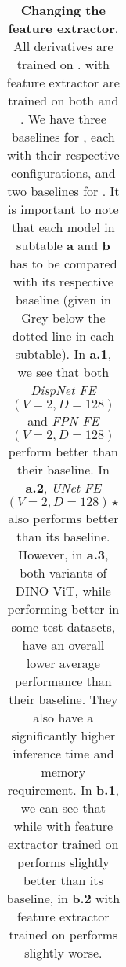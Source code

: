 \begin{table}[ht!]
\begin{adjustbox}{width=1\textwidth}
\begin{tabular}{|l
|c c
|c c
|c c
|c c
|c c
||c |c |c |c |c
|}
\hline
\end{tabular}
\end{adjustbox}
\caption[Changing the feature extractor]{\textbf{Changing the feature extractor}.
All {\mvsn} derivatives are trained on {\bms}. {\rmvd} with {\mvsn} feature extractor are trained on both {\brs} and {\bms}. We have three baselines for {\mvsn}, each with their respective configurations, and two baselines for {\rmvd}. It is important to note that each model in subtable \textbf{a} and \textbf{b} has to be compared with its respective baseline (given in Grey below the dotted line in each subtable). In \textbf{a.1}, we see that both \textit{DispNet FE $(V = 2, D = 128)$} and \textit{FPN FE $(V = 2, D = 128)$} perform better than their baseline. In \textbf{a.2}, \textit{UNet FE $(V = 2, D = 128) \star$} also performs better than its baseline. However, in \textbf{a.3}, both variants of DINO ViT, while performing better in some test datasets, have an overall lower average performance than their baseline. They also have a significantly higher inference time and memory requirement. In \textbf{b.1}, we can see that while {\rmvd} with {\mvsn} feature extractor trained on {\brs} performs slightly better than its baseline, in \textbf{b.2} {\rmvd} with {\mvsn} feature extractor trained on {\bms} performs slightly worse. 
\label{tab:feat-enc}
}
\end{table}

